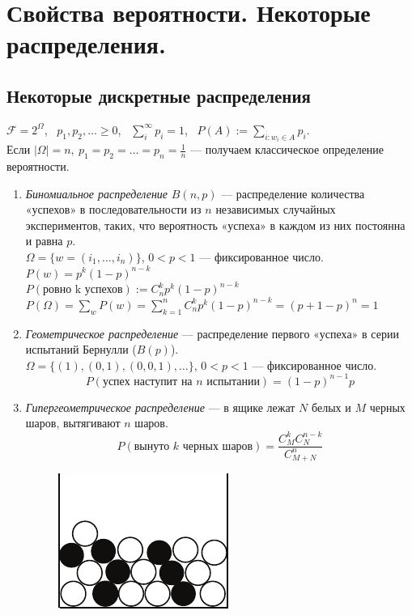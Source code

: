 \section{Свойства вероятности. Некоторые распределения.}
    \subsection{Некоторые дискретные распределения}
        $\mathcal{F} = 2^{\Omega}$, \ $p_1, p_2, \dots \geq 0$, \ $\sum\limits_i^{\infty} p_i = 1$, \ $P(A) := \sum\limits_{i: w_i \in A} p_i$.\\
        Если $|\Omega| = n, \ p_1 = p_2 = \dots = p_n = \frac{1}{n}$ --- получаем классическое определение вероятности.
        \begin{enumerate}
            \item \emph{Биномиальное распределение} $B(n, p)$ ---  распределение количества «успехов» в последовательности из $n$ независимых случайных экспериментов, таких, что вероятность «успеха» в каждом из них постоянна и равна $p$.\\
            $\Omega = \{w = (i_1, \dots, i_n)\}$, $0 < p < 1$ --- фиксированное число.\\
            $P(w) = p^k(1 - p)^{n - k}$\\
            $P(\text{ровно k успехов}) := C_n^kp^k(1 - p)^{n - k}$\\
            $P(\Omega) = \sum\limits_{w}P(w) = \sum\limits_{k = 1}^n C_n^kp^k(1 - p)^{n - k} = (p + 1 - p)^n = 1$
            \item \emph{Геометрическое распределение} --- распределение первого «успеха» в серии испытаний Бернулли ($B(p)$).\\ $\Omega = \{(1), (0, 1), (0, 0, 1), \dots\}$, $0 < p < 1$ --- фиксированное число.\\
            \begin{equation*}
                P(\text{успех наступит на $n$ испытании}) = (1 - p)^{n - 1}p
            \end{equation*}
            \item \emph{Гипергеометрическое распределение} --- в ящике лежат $N$ белых и $M$ черных шаров, вытягивают $n$ шаров.
            \begin{equation*}
                P(\text{вынуто $k$ черных шаров}) = \frac{C_M^kC_N^{n - k}}{C_{M + N}^n}
            \end{equation*}
            \begin{figure}[h!]
				\centering
				\includegraphics[width=0.3\linewidth]{Lect02/hypergeom.pdf}

\end{figure}
\end{enumerate}
